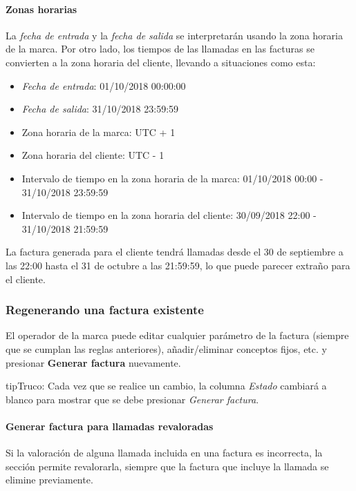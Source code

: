 \documentclass[letterpaper,10pt,spanish]{sphinxmanual}
\begin{document}
\paragraph{Zonas horarias}
\label{administration_portal/brand/invoicing/invoices:timezones}
La \emph{fecha de entrada} y la \emph{fecha de salida} se interpretarán usando la zona horaria de la marca. Por otro lado, los tiempos de las llamadas en las facturas se convierten a la zona horaria del cliente, llevando a situaciones como esta:
\begin{itemize}
\item {} 
\emph{Fecha de entrada}: 01/10/2018 00:00:00

\item {} 
\emph{Fecha de salida}: 31/10/2018 23:59:59

\item {} 
Zona horaria de la marca: UTC + 1

\item {} 
Zona horaria del cliente: UTC - 1

\item {} 
Intervalo de tiempo en la zona horaria de la marca: 01/10/2018 00:00 - 31/10/2018 23:59:59

\item {} 
Intervalo de tiempo en la zona horaria del cliente: 30/09/2018 22:00 - 31/10/2018 21:59:59

\end{itemize}

La factura generada para el cliente tendrá llamadas desde el 30 de septiembre a las 22:00 hasta el 31 de octubre a las 21:59:59, lo que puede parecer extraño para el cliente.


\subsubsection{Regenerando una factura existente}
\label{administration_portal/brand/invoicing/invoices:regenerating-an-existing-invoice}
El operador de la marca puede editar cualquier parámetro de la factura (siempre que se cumplan las reglas anteriores), añadir/eliminar conceptos fijos, etc. y presionar \textbf{Generar factura} nuevamente.

\begin{notice}{tip}{Truco:}
Cada vez que se realice un cambio, la columna \emph{Estado} cambiará a blanco para mostrar que se debe presionar \emph{Generar factura}.
\end{notice}


\paragraph{Generar factura para llamadas revaloradas}
\label{administration_portal/brand/invoicing/invoices:generate-invoice-for-rerated-calls}
Si la valoración de alguna llamada incluida en una factura es incorrecta, la sección {\hyperref[administration_portal/platform/external_calls:external\string-calls]{}} permite revalorarla, siempre que la factura que incluye la llamada se elimine previamente.
\end{document}
